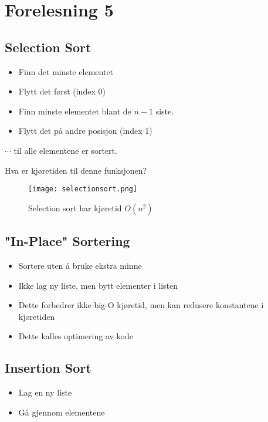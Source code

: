 \documentclass{article}
\begin{document}
    \section{Forelesning 5}

    \subsection{Selection Sort}

    \begin{itemize}
        \item Finn det minste elementet
        \item Flytt det først (index 0)
        \item Finn minste elementet blant de \( n - 1 \) siste.
        \item Flytt det på andre posisjon (index 1)
    \end{itemize}

    \( \cdots  \) til alle elementene er sortert.
\bigskip

Hva er kjøretiden til denne funksjonen?

\begin{figure}[H]
    \begin{center}
        \texttt{[image: selectionsort.png]}
    \end{center}
    \caption{Selection sort har kjøretid \( O\left( n^2 \right) \)}
    \label{fig:selectionsort.png}
\end{figure}

\subsection{"In-Place" Sortering}
\begin{itemize}
    \item Sortere uten å bruke ekstra minne
    \item Ikke lag ny liste, men bytt elementer i listen
    \item Dette forbedrer ikke big-O kjøretid, men kan redusere konstantene i kjøretiden
    \item Dette kalles optimering av kode
\end{itemize}

\subsection{Insertion Sort}
\begin{itemize}
    \item Lag en ny liste
    \item Gå gjennom elementene
\end{itemize}
\end{document}

